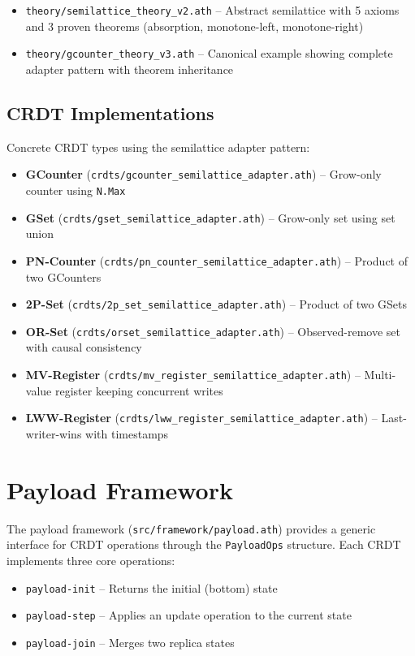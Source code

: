 \begin{itemize}
  \item \texttt{theory/semilattice\_theory\_v2.ath} -- Abstract semilattice with 5 axioms and 3 proven theorems (absorption, monotone-left, monotone-right)
  \item \texttt{theory/gcounter\_theory\_v3.ath} -- Canonical example showing complete adapter pattern with theorem inheritance
\end{itemize}

\subsection{CRDT Implementations}

Concrete CRDT types using the semilattice adapter pattern:

\begin{itemize}
  \item \textbf{GCounter} (\texttt{crdts/gcounter\_semilattice\_adapter.ath}) -- Grow-only counter using \texttt{N.Max}
  \item \textbf{GSet} (\texttt{crdts/gset\_semilattice\_adapter.ath}) -- Grow-only set using set union
  \item \textbf{PN-Counter} (\texttt{crdts/pn\_counter\_semilattice\_adapter.ath}) -- Product of two GCounters
  \item \textbf{2P-Set} (\texttt{crdts/2p\_set\_semilattice\_adapter.ath}) -- Product of two GSets
  \item \textbf{OR-Set} (\texttt{crdts/orset\_semilattice\_adapter.ath}) -- Observed-remove set with causal consistency
  \item \textbf{MV-Register} (\texttt{crdts/mv\_register\_semilattice\_adapter.ath}) -- Multi-value register keeping concurrent writes
  \item \textbf{LWW-Register} (\texttt{crdts/lww\_register\_semilattice\_adapter.ath}) -- Last-writer-wins with timestamps
\end{itemize}

\section{Payload Framework}

The payload framework (\texttt{src/framework/payload.ath}) provides a generic interface for CRDT operations through the \texttt{PayloadOps} structure. Each CRDT implements three core operations:

\begin{itemize}
  \item \texttt{payload-init} -- Returns the initial (bottom) state
  \item \texttt{payload-step} -- Applies an update operation to the current state
  \item \texttt{payload-join} -- Merges two replica states
\end{itemize}

